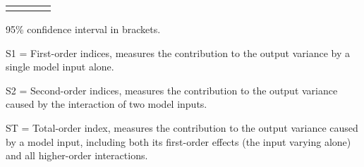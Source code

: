 \begin{table}[htp]
\begin{threeparttable}
\begin{tabular}{lccc}
	 \\
\addlinespace
\hline
\end{tabular}
\begin{tablenotes}
\scriptsize
\item 95\% confidence interval in brackets.
\item S1 = First-order indices,  measures the contribution to the output variance by a single model input alone.
\item S2 = Second-order indices,  measures the contribution to the output variance caused by the interaction of two model inputs.
\item ST = Total-order index, measures the contribution to the output variance caused by a model input, including both its first-order effects (the input varying alone) and all higher-order interactions.
\end{tablenotes}
\end{threeparttable}
\end{table}